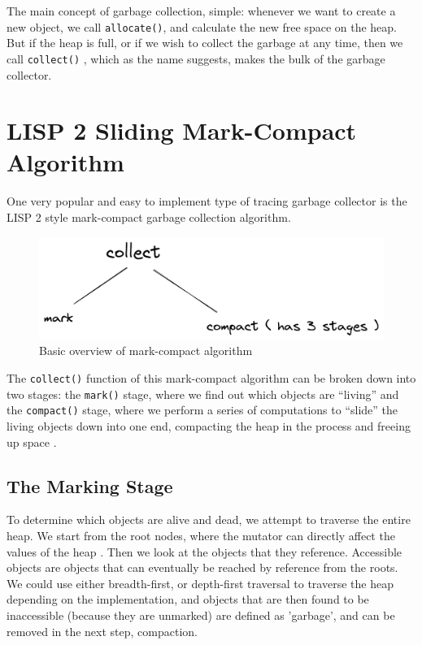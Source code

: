 \documentclass[index]{subfiles}
\begin{document}
The main concept of garbage collection, simple: whenever we want to create a new object, we call \verb+allocate()+, and calculate the new free space on the heap. But if the heap is full, or if we wish to collect the garbage at any time, then we call \verb+collect()+ \cite{gc_handbook}, which as the name suggests, makes the bulk of the garbage collector.

\section{LISP 2 Sliding Mark-Compact Algorithm}

One very popular and easy to implement type of tracing garbage collector is the LISP 2 style mark-compact garbage collection algorithm.

\begin{figure}[H]
    \centering
    \includegraphics[scale=0.3]{pics/mark-compact-overview.png}
    \caption{Basic overview of mark-compact algorithm}
\end{figure}

The \verb+collect()+ function of this mark-compact algorithm can be broken down into two stages: the \verb+mark()+ stage, where we find out which objects are ``living'' and the \verb+compact()+ stage, where we perform a series of computations to ``slide'' the living objects down into one end, compacting the heap in the process and freeing up space \cite[Chapter~3]{gc_handbook}.

\subsection{The Marking Stage}

To determine which objects are alive and dead, we attempt to traverse the entire heap. We start from the root nodes, where the mutator can directly affect the values of the heap \cites[3.2~Marking]{redhat_openjdk}[Chapter~3]{gc_handbook}. Then we look at the objects that they reference. Accessible objects are objects that can eventually be reached by reference from the roots. We could use either breadth-first, or depth-first traversal to traverse the heap depending on the implementation, and  objects that are then found to be inaccessible (because they are unmarked) are defined as 'garbage', and can be removed in the next step, compaction.
\end{document}
